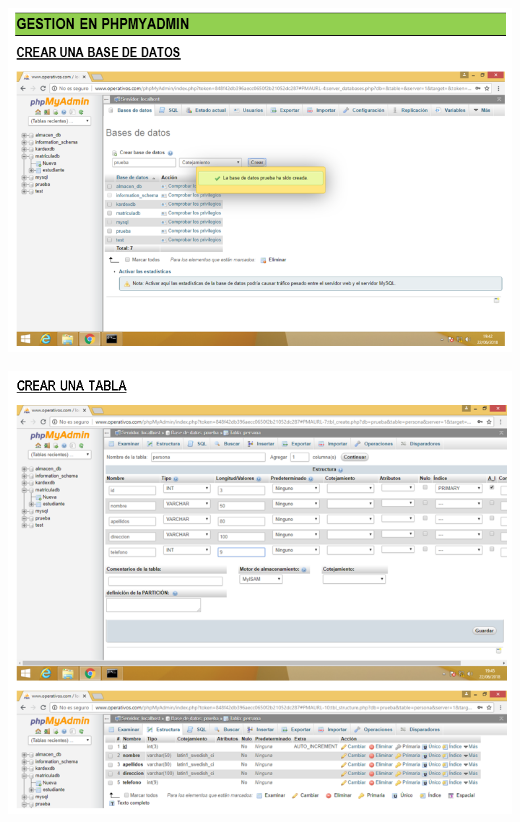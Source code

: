 \begin{itemize}
		\begin{center}
		\includegraphics[width=15cm]{./Imagenes/n}
		\end{center}
\end{itemize}

\begin{itemize}
		\begin{center}
		\includegraphics[width=15cm]{./Imagenes/nn}
		\end{center}
\end{itemize}

